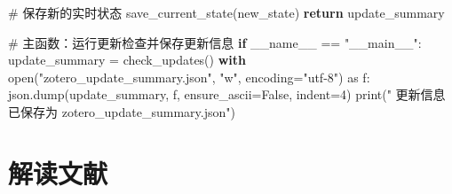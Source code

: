 \documentclass[
  letterpaper,
  DIV=11,
  numbers=noendperiod]{scrreprt}
\newenvironment{Shaded}{\begin{snugshade}}{\end{snugshade}}
\newcommand{\BuiltInTok}[1]{\textcolor[rgb]{0.00,0.23,0.31}{#1}}
\newcommand{\CommentTok}[1]{\textcolor[rgb]{0.37,0.37,0.37}{#1}}
\newcommand{\ControlFlowTok}[1]{\textcolor[rgb]{0.00,0.23,0.31}{\textbf{#1}}}
\newcommand{\DecValTok}[1]{\textcolor[rgb]{0.68,0.00,0.00}{#1}}
\newcommand{\ImportTok}[1]{\textcolor[rgb]{0.00,0.46,0.62}{#1}}
\newcommand{\NormalTok}[1]{\textcolor[rgb]{0.00,0.23,0.31}{#1}}
\newcommand{\OperatorTok}[1]{\textcolor[rgb]{0.37,0.37,0.37}{#1}}
\newcommand{\StringTok}[1]{\textcolor[rgb]{0.13,0.47,0.30}{#1}}
\newcommand{\VariableTok}[1]{\textcolor[rgb]{0.07,0.07,0.07}{#1}}
\begin{document}
\begin{Shaded}
\begin{Highlighting}[]
    \CommentTok{\# 保存新的实时状态}
\NormalTok{    save\_current\_state(new\_state)}
    \ControlFlowTok{return}\NormalTok{ update\_summary}

\CommentTok{\# 主函数：运行更新检查并保存更新信息}
\ControlFlowTok{if} \VariableTok{\_\_name\_\_} \OperatorTok{==} \StringTok{"\_\_main\_\_"}\NormalTok{:}
\NormalTok{    update\_summary }\OperatorTok{=}\NormalTok{ check\_updates()}
    \ControlFlowTok{with} \BuiltInTok{open}\NormalTok{(}\StringTok{"zotero\_update\_summary.json"}\NormalTok{, }\StringTok{"w"}\NormalTok{, encoding}\OperatorTok{=}\StringTok{"utf{-}8"}\NormalTok{) }\ImportTok{as}\NormalTok{ f:}
\NormalTok{        json.dump(update\_summary, f, ensure\_ascii}\OperatorTok{=}\VariableTok{False}\NormalTok{, indent}\OperatorTok{=}\DecValTok{4}\NormalTok{)}
    \BuiltInTok{print}\NormalTok{(}\StringTok{" 更新信息已保存为 zotero\_update\_summary.json"}\NormalTok{)}
\end{Highlighting}
\end{Shaded}

\section{解读文献}\label{ux89e3ux8bfbux6587ux732e}
\end{document}
